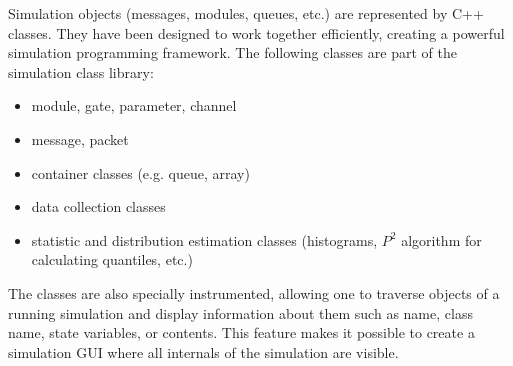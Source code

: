 Simulation objects (messages, modules, queues, etc.) are represented
by C++ classes. They have been designed to work together efficiently,
creating a powerful simulation programming framework.
The following classes are part of the simulation class library:

\begin{itemize}
  \item module, gate, parameter, channel
  \item message, packet
  \item container classes (e.g. queue, array)
  \item data collection classes
  \item statistic and distribution estimation classes (histograms, $P^2$
        algorithm for calculating quantiles, etc.)
\end{itemize}

The classes are also specially instrumented, allowing one
to traverse objects of a running simulation and display information
about them such as name, class name, state variables, or contents.
This feature makes it possible to create a simulation GUI where
all internals of the simulation are visible.


